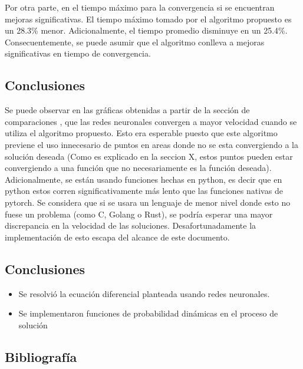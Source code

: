 \documentclass[11pt]{article}
\providecommand{\tightlist}{%
      \setlength{\itemsep}{0pt}\setlength{\parskip}{0pt}}
\begin{document}
Por otra parte, en el tiempo máximo para la convergencia si se
encuentran mejoras significativas. El tiempo máximo tomado por el
algoritmo propuesto es un 28.3\% menor. Adicionalmente, el tiempo
promedio disminuye en un 25.4\%. Consecuentemente, se puede asumir que
el algoritmo conlleva a mejoras significativas en tiempo de
convergencia.

    \hypertarget{conclusiones}{%
\subsection{Conclusiones}\label{conclusiones}}

Se puede observar en las gráficas obtenidas a partir de la sección de
comparaciones , que las redes neuronales convergen a mayor velocidad
cuando se utiliza el algoritmo propuesto. Esto era esperable puesto que
este algoritmo previene el uso innecesario de puntos en areas donde no
se esta convergiendo a la solución deseada (Como es explicado en la
seccion X, estos puntos pueden estar convergiendo a una función que no
necesariamente es la función deseada). Adicionalmente, se están usando
funciones hechas en python, es decir que en python estos corren
significativamente más lento que las funciones nativas de pytorch. Se
considera que si se usara un lenguaje de menor nivel donde esto no fuese
un problema (como C, Golang o Rust), se podría esperar una mayor
discrepancia en la velocidad de las soluciones. Desafortunadamente la
implementación de esto escapa del alcance de este documento.

\hypertarget{conclusiones-1}{%
\subsection{Conclusiones}\label{conclusiones-1}}

\begin{itemize}
\tightlist
\item
  Se resolvió la ecuación diferencial planteada usando redes neuronales.
\item
  Se implementaron funciones de probabilidad dinámicas en el proceso de
  solución
\end{itemize}

    \hypertarget{bibliografuxeda}{%
\subsection{Bibliografía}\label{bibliografuxeda}}

    


    
    
    
\end{document}
